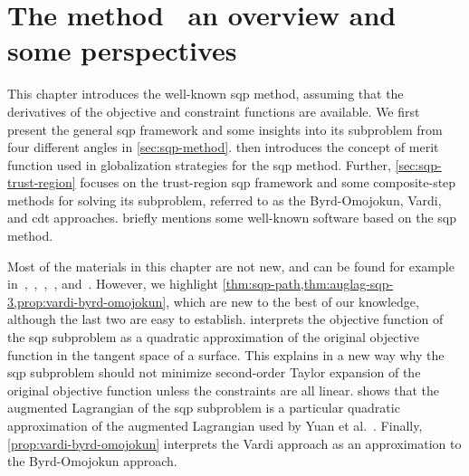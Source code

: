 %
%
%
\chapter{The  method \textemdash\ an overview and some perspectives}
\label{ch:sqp}

This chapter introduces the well-known \gls{sqp} method, assuming that the derivatives of the objective and constraint functions are available.
We first present the general \gls{sqp} framework and some insights into its subproblem from four different angles in \cref{sec:sqp-method}.
 then introduces the concept of merit function used in globalization strategies for the \gls{sqp} method.
Further, \cref{sec:sqp-trust-region} focuses on the trust-region \gls{sqp} framework and some composite-step methods for solving its subproblem, referred to as the Byrd-Omojokun, Vardi, and \gls{cdt} approaches.
 briefly mentions some well-known software based on the \gls{sqp} method.

Most of the materials in this chapter are not new, and can be found for example in~\cite{Boggs_Tolle_1995,Gould_Toint_2000},~\cite[Ch.~15]{Conn_Gould_Toint_2000},~\cite[Ch.~12]{Sun_Yuan_2006},~\cite[Ch.~18]{Nocedal_Wright_2006}, and~\cite{Schittkowski_Yuan_2011,Gill_Wong_2011}.
However, we highlight \cref{thm:sqp-path,thm:auglag-sqp-3,prop:vardi-byrd-omojokun}, which are new to the best of our knowledge, although the last two are easy to establish.
 interprets the objective function of the \gls{sqp} subproblem as a quadratic approximation of the original objective function in the tangent space of a surface.
This explains in a new way why the \gls{sqp} subproblem should not minimize second-order Taylor expansion of the original objective function unless the constraints are all linear.
 shows that the augmented Lagrangian of the \gls{sqp} subproblem is a particular quadratic approximation of the augmented Lagrangian used by Yuan et al.~\cite{Niu_Yuan_2010,Wang_Yuan_2014}.
Finally, \cref{prop:vardi-byrd-omojokun} interprets the Vardi approach as an approximation to the Byrd-Omojokun approach.

